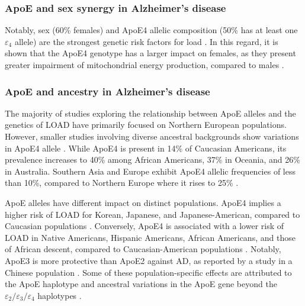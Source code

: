 \documentclass{amsart}
\begin{document}
\subsubsection{ApoE and sex synergy in Alzheimer's disease}
Notably, sex (60\% females) and ApoE4 allelic composition (50\% has at least one $\varepsilon_4$ allele) are the strongest genetic risk factors for \acrshort{load} \cite{Arnold2020SexMetabolome}. In this regard, it is shown that the ApoE4 genotype has a larger impact on females, as they present greater impairment of mitochondrial energy production, compared to males \cite{Arnold2020SexMetabolome, Yassine2020APOEDisease}.

\subsubsection{ApoE and ancestry in Alzheimer's disease} \label{ancestry}
The majority of studies exploring the relationship between ApoE alleles and the genetics of LOAD have primarily focused on Northern European populations\cite{Yang2023ApolipoproteinDisease}. However, smaller studies involving diverse ancestral backgrounds show variations in ApoE4 allele \cite{Yang2023ApolipoproteinDisease}. While ApoE4 is present in 14\% of Caucasian Americans, its prevalence increases to 40\% among African Americans, 37\% in Oceania, and 26\% in Australia. Southern Asia and Europe exhibit ApoE4 allelic frequencies of less than 10\%, compared to Northern Europe where it rises to 25\% \cite{Belloy2019AForward, Egert2012ApoEFactors, Eisenberg2010WorldwideHistory, Logue2011AAmericans}.

ApoE alleles have different impact on distinct populations. ApoE4 implies a higher risk of LOAD for Korean, Japanese, and Japanese-American, compared to Caucasian populations \cite{Farrer1997EffectsMeta-analysis}. Conversely, ApoE4 is associated with a lower risk of LOAD in Native Americans, Hispanic Americans, African Americans, and those of African descent, compared to Caucasian-American populations \cite{Farrer1997EffectsMeta-analysis, Blue2019LocalHispanics, Suchy-Dicey2022APOEStudy, Rajabli2018AncestralPopulations, Naslavsky2022GlobalSample}. Notably, ApoE3 is more protective than ApoE2 against AD, as reported by a study in a Chinese population \cite{Chen2011ApolipoproteinDisease}. Some of these population-specific effects are attributed to the ApoE haplotype and ancestral variations in the ApoE gene beyond the $\varepsilon_2/\varepsilon_3/\varepsilon_4$ haplotypes \cite{Blue2019LocalHispanics, Rajabli2018AncestralPopulations}.
\end{document}

